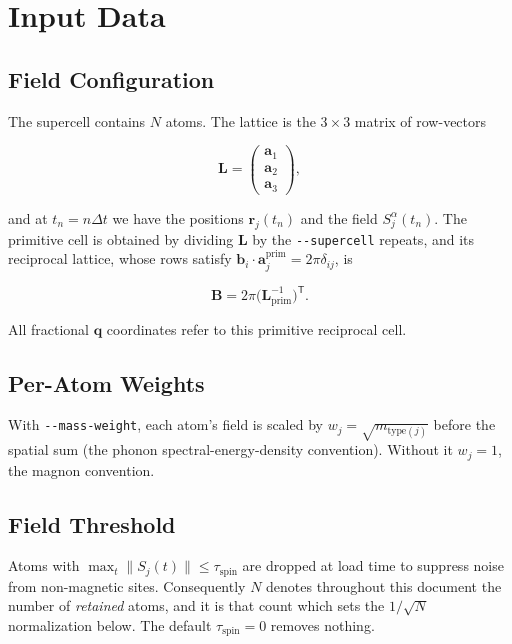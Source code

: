 \documentclass[12pt, a4paper, oneside]{article}
\newcommand{\qvec}{\mathbf{q}}
\newcommand{\rvec}{\mathbf{r}}
\newcommand{\avec}{\mathbf{a}}
\newcommand{\bvec}{\mathbf{b}}
\newcommand{\Na}{N}
\newcommand{\field}{S}
\begin{document}
\section{Input Data}

\subsection{Field Configuration}

The supercell contains $\Na$ atoms. The lattice is the $3\times3$ matrix of
row-vectors

\begin{equation}
    \mathbf{L} = \begin{pmatrix} \avec_1 \\ \avec_2 \\ \avec_3 \end{pmatrix},
\end{equation}

and at $t_n = n\Delta t$ we have the positions $\rvec_j(t_n)$ and the field
$\field_j^\alpha(t_n)$. The primitive cell is obtained by dividing $\mathbf{L}$
by the \texttt{-\/-supercell} repeats, and its reciprocal lattice, whose rows
satisfy $\bvec_i\cdot\avec_j^{\text{prim}} = 2\pi\delta_{ij}$, is

\begin{equation}
    \mathbf{B} = 2\pi\bigl(\mathbf{L}_{\text{prim}}^{-1}\bigr)^{\mathsf T}.
\end{equation}

All fractional $\qvec$ coordinates refer to this primitive reciprocal cell.

\subsection{Per-Atom Weights}

With \texttt{-\/-mass-weight}, each atom's field is scaled by $w_j =
\sqrt{m_{\text{type}(j)}}$ before the spatial sum (the phonon
spectral-energy-density convention). Without it $w_j = 1$, the magnon
convention.

\subsection{Field Threshold}

Atoms with $\max_t \lVert\field_j(t)\rVert \le \tau_{\text{spin}}$ are dropped
at load time to suppress noise from non-magnetic sites. Consequently $\Na$
denotes throughout this document the number of \emph{retained} atoms, and it is
that count which sets the $1/\sqrt{\Na}$ normalization below. The default
$\tau_{\text{spin}} = 0$ removes nothing.
\end{document}
